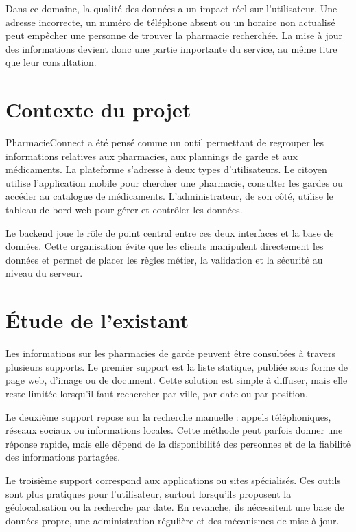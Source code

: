 Dans ce domaine, la qualité des données a un impact réel sur l'utilisateur. Une adresse incorrecte, un
numéro de téléphone absent ou un horaire non actualisé peut empêcher une personne de trouver la
pharmacie recherchée. La mise à jour des informations devient donc une partie importante du service, au
même titre que leur consultation.

\section{Contexte du projet}

PharmacieConnect a été pensé comme un outil permettant de regrouper les informations relatives aux
pharmacies, aux plannings de garde et aux médicaments. La plateforme s'adresse à deux types
d'utilisateurs. Le citoyen utilise l'application mobile pour chercher une pharmacie, consulter les gardes
ou accéder au catalogue de médicaments. L'administrateur, de son côté, utilise le tableau de bord web
pour gérer et contrôler les données.

Le backend joue le rôle de point central entre ces deux interfaces et la base de données. Cette
organisation évite que les clients manipulent directement les données et permet de placer les règles
métier, la validation et la sécurité au niveau du serveur.

\section{Étude de l'existant}

Les informations sur les pharmacies de garde peuvent être consultées à travers plusieurs supports. Le
premier support est la liste statique, publiée sous forme de page web, d'image ou de document. Cette
solution est simple à diffuser, mais elle reste limitée lorsqu'il faut rechercher par ville, par date ou par
position.

Le deuxième support repose sur la recherche manuelle : appels téléphoniques, réseaux sociaux ou
informations locales. Cette méthode peut parfois donner une réponse rapide, mais elle dépend de la
disponibilité des personnes et de la fiabilité des informations partagées.

Le troisième support correspond aux applications ou sites spécialisés. Ces outils sont plus pratiques pour
l'utilisateur, surtout lorsqu'ils proposent la géolocalisation ou la recherche par date. En revanche, ils
nécessitent une base de données propre, une administration régulière et des mécanismes de mise à jour.

